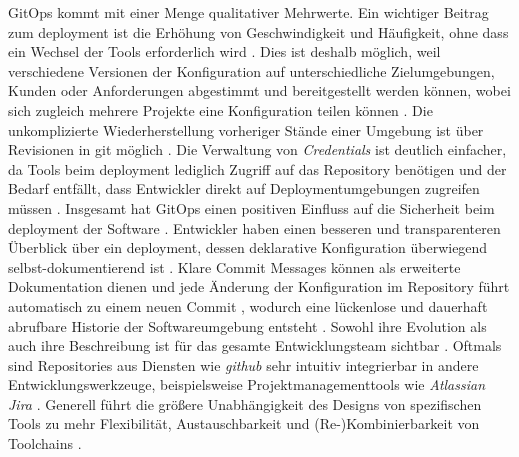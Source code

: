 GitOps kommt mit einer Menge qualitativer Mehrwerte. Ein wichtiger Beitrag zum \Gls{deployment} ist die Erhöhung von Geschwindigkeit und Häufigkeit, ohne dass ein Wechsel der Tools erforderlich wird \cite{008:GitOps-Approach-to-Cloud-Cluster-System-Deployment,109:GitOps}. Dies ist deshalb möglich, weil verschiedene Versionen der Konfiguration auf unterschiedliche Zielumgebungen, Kunden oder Anforderungen abgestimmt und bereitgestellt werden können, wobei sich zugleich mehrere Projekte eine Konfiguration teilen können \cite{008:GitOps-Approach-to-Cloud-Cluster-System-Deployment}. Die unkomplizierte Wiederherstellung vorheriger Stände einer Umgebung ist über Revisionen in \Gls{git} möglich \cite{008:GitOps-Approach-to-Cloud-Cluster-System-Deployment,010:Efficient-Application-Deployment-GitOps-for-Faster-and-Secure-CI-CD-Cycles,109:GitOps}. Die Verwaltung von \textit{Credentials} ist deutlich einfacher, da Tools beim \Gls{deployment} lediglich Zugriff auf das Repository benötigen \cite{008:GitOps-Approach-to-Cloud-Cluster-System-Deployment,109:GitOps} und der Bedarf entfällt, dass Entwickler direkt auf Deploymentumgebungen zugreifen müssen \cite{010:Efficient-Application-Deployment-GitOps-for-Faster-and-Secure-CI-CD-Cycles}. Insgesamt hat GitOps einen positiven Einfluss auf die Sicherheit beim \Gls{deployment} der Software \cite{008:GitOps-Approach-to-Cloud-Cluster-System-Deployment,010:Efficient-Application-Deployment-GitOps-for-Faster-and-Secure-CI-CD-Cycles,109:GitOps}. Entwickler haben einen besseren und transparenteren Überblick über ein \Gls{deployment}, dessen deklarative Konfiguration überwiegend selbst-dokumentierend ist \cite{008:GitOps-Approach-to-Cloud-Cluster-System-Deployment,109:GitOps}. Klare Commit Messages können als erweiterte Dokumentation dienen \cite{008:GitOps-Approach-to-Cloud-Cluster-System-Deployment} und jede Änderung der Konfiguration im Repository führt automatisch zu einem neuen Commit \cite{010:Efficient-Application-Deployment-GitOps-for-Faster-and-Secure-CI-CD-Cycles}, wodurch eine lückenlose und dauerhaft abrufbare Historie der Softwareumgebung entsteht \cite{008:GitOps-Approach-to-Cloud-Cluster-System-Deployment,010:Efficient-Application-Deployment-GitOps-for-Faster-and-Secure-CI-CD-Cycles,109:GitOps}. Sowohl ihre Evolution als auch ihre Beschreibung ist für das gesamte Entwicklungsteam sichtbar \cite{109:GitOps}. Oftmals sind Repositories aus Diensten wie \textit{\Gls{github}} sehr intuitiv integrierbar in andere Entwicklungswerkzeuge, beispielsweise Projektmanagementtools wie \textit{Atlassian Jira} \cite{008:GitOps-Approach-to-Cloud-Cluster-System-Deployment}. Generell führt die größere Unabhängigkeit des Designs von spezifischen Tools zu mehr Flexibilität, Austauschbarkeit und (Re-)Kombinierbarkeit von Toolchains \cite{010:Efficient-Application-Deployment-GitOps-for-Faster-and-Secure-CI-CD-Cycles}.

